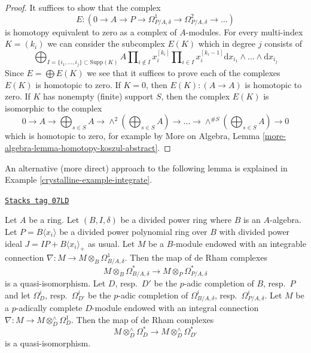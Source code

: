 \begin{proof}
It suffices to show that the complex
$$
E :
(0 \to A \to P \to \Omega^1_{P/A, \delta} \to
\Omega^2_{P/A, \delta} \to \ldots)
$$
is homotopy equivalent to zero as a complex of $A$-modules.
For every multi-index $K = (k_i)$ we can consider the subcomplex $E(K)$
which in degree $j$ consists of
$$
\bigoplus\nolimits_{I = \{i_1, \ldots, i_j\} \subset \text{Supp}(K)}
A
\prod\nolimits_{i \not \in I} x_i^{[k_i]}
\prod\nolimits_{i \in I} x_i^{[k_i - 1]}
\text{d}x_{i_1} \wedge \ldots \wedge \text{d}x_{i_j}
$$
Since $E = \bigoplus E(K)$ we see that it suffices to prove each of the
complexes $E(K)$ is homotopic to zero. If $K = 0$, then
$E(K) : (A \to A)$ is homotopic to zero. If $K$ has nonempty (finite)
support $S$, then the complex $E(K)$ is isomorphic to the complex
$$
0 \to A \to
\bigoplus\nolimits_{s \in S} A \to
\wedge^2(\bigoplus\nolimits_{s \in S} A) \to
\ldots \to \wedge^{\# S}(\bigoplus\nolimits_{s \in S} A) \to 0
$$
which is homotopic to zero, for example by
More on Algebra, Lemma \ref{more-algebra-lemma-homotopy-koszul-abstract}.
\end{proof}

An alternative (more direct) approach to the following lemma is
explained in Example \ref{crystalline-example-integrate}.

\begin{lemma}
\label{crystalline-lemma-relative-poincare}
\href{https://stacks.math.columbia.edu/tag/07LD}{\texttt{Stacks tag 07LD}}

Let $A$ be a ring. Let $(B, I, \delta)$ be a divided power ring
where $B$ is an $A$-algebra.
Let $P = B\langle x_i \rangle$ be a divided power polynomial
ring over $B$ with divided power ideal $J = IP + B\langle x_i \rangle_{+}$
as usual. Let $M$ be a $B$-module endowed with an integrable connection
$\nabla : M \to M \otimes_B \Omega^1_{B/A, \delta}$. Then the map of
de Rham complexes
$$
M \otimes_B \Omega^*_{B/A, \delta}
\longrightarrow
M \otimes_P \Omega^*_{P/A, \delta}
$$
is a quasi-isomorphism. Let $D$, resp.\ $D'$ be the $p$-adic completion of
$B$, resp.\ $P$ and let $\Omega^i_D$, resp.\ $\Omega^i_{D'}$ be the $p$-adic
completion of $\Omega^i_{B/A, \delta}$,
resp.\ $\Omega^i_{P/A, \delta}$. Let $M$ be a $p$-adically complete
$D$-module endowed with an integral connection
$\nabla : M \to M \otimes^\wedge_D \Omega^1_D$.
Then the map of de Rham complexes
$$
M \otimes^\wedge_D \Omega^*_D
\longrightarrow
M \otimes^\wedge_D \Omega^*_{D'}
$$
is a quasi-isomorphism.
\end{lemma}

